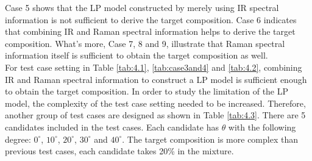 \begin{table} \tiny 
{}
\caption{Test case 5 to 9 setting for methionine candidates}
\label{tab:4.2}
\end{table}	

Case 5 shows that the LP model constructed by merely using IR spectral information is not sufficient to derive the target composition. Case 6 indicates that combining IR and Raman spectral information helps to derive the target composition. What's more, Case 7, 8 and 9, illustrate that Raman spectral information itself is sufficient to obtain the target composition as well. \\

For test case setting in Table \ref{tab:4.1}, \ref{tab:case3and4} and \ref{tab:4.2}, combining IR and Raman spectral information to construct a LP model is sufficient enough to obtain the target composition. In order to study the limitation of the LP model, the complexity of the test case setting needed to be increased. Therefore, another group of test cases are designed as shown in Table \ref{tab:4.3}. There are 5 candidates included in the test cases. Each candidate has $\theta$ with the following degree: $0^{\circ}$, $10^{\circ}$, $20^{\circ}$, $30^{\circ}$ and $40^{\circ}$. The target composition is more complex than previous test cases, each candidate takes 20\% in the mixture. \\

